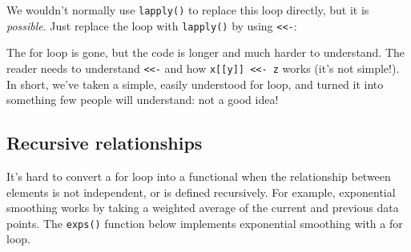 \begin{Shaded}
\begin{Highlighting}[]
\StringTok{ }\NormalTok{(}
   \StringTok{ }\NormalTok{,}
    \NormalTok{(}\NormalTok{, }\NormalTok{))}
\NormalTok{)}
  \StringTok{ }
\NormalTok{\}}
\end{Highlighting}
\end{Shaded}

We wouldn't normally use \texttt{lapply()} to replace this loop
directly, but it is \emph{possible}. Just replace the loop with
\texttt{lapply()} by using \texttt{\textless{}\textless{}-}:
\indexc{<<-}

\begin{Shaded}
\begin{Highlighting}[]
\NormalTok{(}
  \StringTok{ }
\NormalTok{\})}
\end{Highlighting}
\end{Shaded}

The for loop is gone, but the code is longer and much harder to
understand. The reader needs to understand
\texttt{\textless{}\textless{}-} and how
\texttt{x{[}{[}y{]}{]} \textless{}\textless{}- z} works (it's not
simple!). In short, we've taken a simple, easily understood for loop,
and turned it into something few people will understand: not a good
idea!

\subsection{Recursive relationships}

It's hard to convert a for loop into a functional when the relationship
between elements is not independent, or is defined recursively. For
example, exponential smoothing works by taking a weighted average of the
current and previous data points. The \texttt{exps()} function below
implements exponential smoothing with a for loop.


